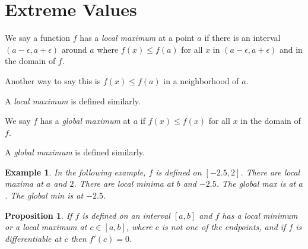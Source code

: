\documentclass[11pt]{book}
\newtheorem{prop}{Proposition}
\newtheorem{example}{Example}
\numberwithin{example}{chapter}
\begin{document}
\section{Extreme Values}


We say a function $f$ has a \emph{local maximum} at a point $a$ if there is an interval $(a-\epsilon,a+\epsilon)$ around $a$ where $f(x)\leq f(a)$ for all $x$ in $(a-\epsilon,a+\epsilon)$ and in the domain of $f$. 

Another way to say this is $f(x)\leq f(a)$ in a neighborhood of $a$.  

A \emph{local maximum} is defined similarly.  


We say $f$ has a \emph{global maximum} at $a$ if $f(x)\leq f(x)$ for all $x$ in the domain of $f$.  

A \emph{global maximum} is defined similarly.  

\begin{example}

In the following example, $f$ is defined on $[-2.5,2]$.  There are local maxima at $a$ and $2$.  There are local minima at $b$ and $-2.5$.  The global max is at $a$.  The global min is at $-2.5$.  




\begin{center}
\end{center}

\end{example}


\begin{prop}
If $f$ is defined on an interval $[a,b]$ and $f$ has a local minimum or a local maximum at $c \in [a,b]$, where $c$ is not one of the endpoints, and if $f$ is differentiable at $c$ then $f'(c)=0$.   
\end{prop}
\end{document}

